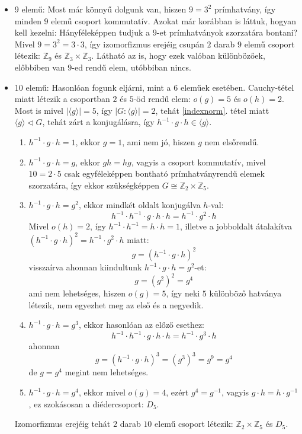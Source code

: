 \documentclass[12pt]{book}
\theoremstyle{plain} %
\theoremstyle{definition} %
\theoremstyle{remark}
\numberwithin{equation}{section}  %
\def\Z{\mathbb{Z}}
\begin{document}
	\begin{itemize}
		\item 9 elemű: Most már könnyű dolgunk van, hiszen $9=3^2$ prímhatvány, így minden $9$ elemű csoport kommutatív. Azokat már korábban is láttuk, hogyan kell kezelni: Hányféleképpen tudjuk a $9$-et prímhatványok szorzatára bontani? Mivel $9=3^2=3\cdot 3$, így izomorfizmus erejéig csupán $2$ darab $9$ elemű csoport létezik: $\Z_9$ és $\Z_3\times \Z_3$. Látható az is, hogy ezek valóban különbözőek, előbbiben van $9$-ed rendű elem, utóbbiban nincs.
		\item 10 elemű: Hasonlóan fogunk eljárni, mint a $6$ eleműek esetében. Cauchy-tétel miatt létezik a csoportban $2$ és $5$-öd rendű elem: $o(g) = 5$ és $o(h) = 2$. Most is mivel $|\langle g \rangle| = 5$, így $|G:\langle g \rangle| = 2$, tehát \ref{indexnorm}. tétel miatt $\langle g \rangle \triangleleft G$, tehát zárt a konjugálásra, így $h^{-1}\cdot g \cdot h \in \langle g \rangle$.
		\begin{enumerate}
			\item $h^{-1}\cdot g \cdot h = 1$, ekkor $g=1$, ami nem jó, hiszen $g$ nem elsőrendű.
			\item $h^{-1}\cdot g \cdot h = g$, ekkor $gh=hg$, vagyis a csoport kommutatív, mivel $10=2\cdot 5$ csak egyféleképpen bontható prímhatványrendű elemek szorzatára, így ekkor szükségképpen $G\cong \Z_2\times \Z_5$.
			\item $h^{-1}\cdot g \cdot h = g^2$, ekkor mindkét oldalt konjugálva $h$-val:
			\[ h^{-1} \cdot h^{-1} \cdot g \cdot h \cdot h = h^{-1} \cdot g^2 \cdot h  \]
			Mivel $o(h) = 2$, így $h^{-1}\cdot h^{-1} = h\cdot h = 1$, illetve a jobboldalt átalakítva $(h^{-1}\cdot g \cdot h)^2 = h^{-1} \cdot g^2 \cdot h$ miatt:
			\[ g = (h^{-1} \cdot g \cdot h)^2  \]
			visszaírva ahonnan kiindultunk $h^{-1}\cdot g \cdot h = g^2$-et:
			\[ g = (g^2)^2 = g^4  \]
			ami nem lehetséges, hiszen $o(g) = 5$, így neki $5$ különböző hatványa létezik, nem egyezhet meg az első és a negyedik.
			\item $h^{-1}\cdot g \cdot h = g^3$, ekkor hasonlóan az előző esethez:
			\[ h^{-1} \cdot h^{-1} \cdot g \cdot h \cdot h = h^{-1} \cdot g^3 \cdot h \]
			ahonnan
			\[ g = (h^{-1}\cdot g\cdot h)^3 = (g^3)^3 = g^9 = g^4  \]
			de $g=g^4$ megint nem lehetséges.
			\item $h^{-1} \cdot g \cdot h = g^4$, ekkor mivel $o(g) = 4$, ezért $g^4 = g^{-1}$, vagyis $g\cdot h = h \cdot g^{-1}$, ez szokásosan a diédercsoport: $D_5$.
		\end{enumerate}
		Izomorfizmus erejéig tehát $2$ darab $10$ elemű csoport létezik: $\Z_2\times \Z_5$ és $D_5$.
	\end{itemize}
	
\end{document}
